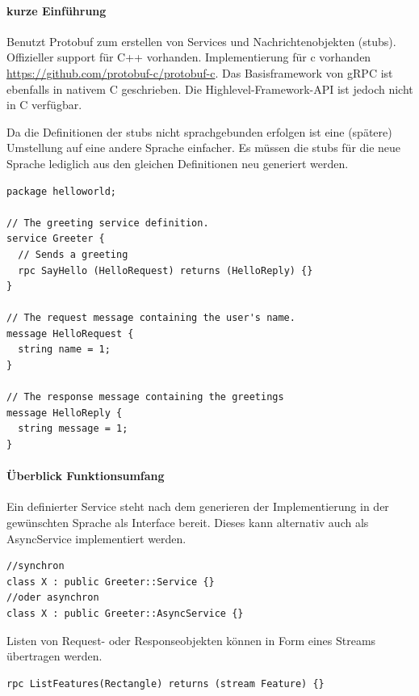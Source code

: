 \documentclass[a4paper,10pt]{article}
\begin{document}
\paragraph{kurze Einführung}


Benutzt Protobuf zum erstellen von Services und Nachrichtenobjekten (stubs).
Offizieller support für C++ vorhanden.
Implementierung für c vorhanden \url{https://github.com/protobuf-c/protobuf-c}.
Das Basisframework von gRPC ist ebenfalls in nativem C geschrieben.
Die Highlevel-Framework-API ist jedoch nicht in C verfügbar.

Da die Definitionen der stubs nicht sprachgebunden erfolgen ist eine (spätere) Umstellung auf eine andere Sprache einfacher.
Es müssen die stubs für die neue Sprache lediglich aus den gleichen Definitionen neu generiert werden.

\begin{lstlisting}[frame=single,caption=Beispiel grpc]
package helloworld;

// The greeting service definition.
service Greeter {
  // Sends a greeting
  rpc SayHello (HelloRequest) returns (HelloReply) {}
}

// The request message containing the user's name.
message HelloRequest {
  string name = 1;
}

// The response message containing the greetings
message HelloReply {
  string message = 1;
}
\end{lstlisting}

\paragraph{Überblick Funktionsumfang}

Ein definierter Service steht nach dem generieren der Implementierung in der gewünschten Sprache als Interface bereit.
Dieses kann alternativ auch als AsyncService implementiert werden.

\begin{lstlisting}[frame=single,caption=grpc Service Definition]
//synchron
class X : public Greeter::Service {}
//oder asynchron
class X : public Greeter::AsyncService {}
\end{lstlisting}

Listen von Request- oder Responseobjekten können in Form eines Streams übertragen werden.

\begin{lstlisting}[frame=single,caption=grpc Funktion Definition]
rpc ListFeatures(Rectangle) returns (stream Feature) {}
\end{lstlisting}
\end{document}
